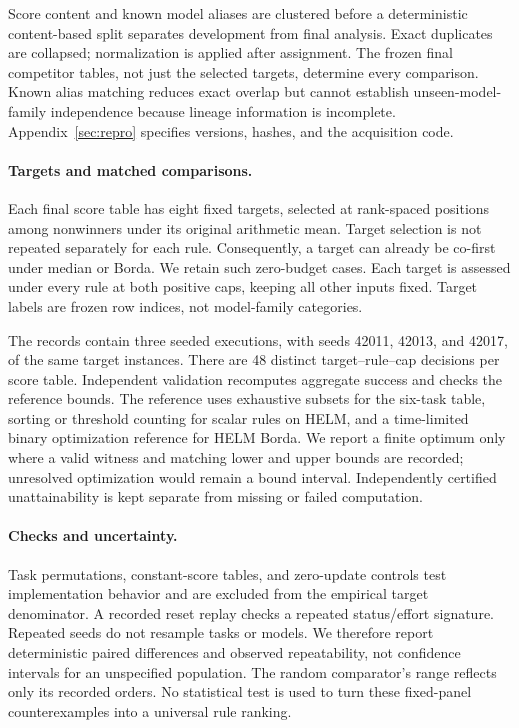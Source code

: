 \documentclass{article}
\begin{document}
Score content and known model aliases are clustered before a deterministic content-based split separates development from final analysis. Exact duplicates are collapsed; normalization is applied after assignment. The frozen final competitor tables, not just the selected targets, determine every comparison. Known alias matching reduces exact overlap but cannot establish unseen-model-family independence because lineage information is incomplete. Appendix~\ref{sec:repro} specifies versions, hashes, and the acquisition code.

\paragraph{Targets and matched comparisons.}
Each final score table has eight fixed targets, selected at rank-spaced positions among nonwinners under its original arithmetic mean. Target selection is not repeated separately for each rule. Consequently, a target can already be co-first under median or Borda. We retain such zero-budget cases. Each target is assessed under every rule at both positive caps, keeping all other inputs fixed. Target labels are frozen row indices, not model-family categories.

The records contain three seeded executions, with seeds 42011, 42013, and 42017, of the same target instances. There are 48 distinct target--rule--cap decisions per score table. Independent validation recomputes aggregate success and checks the reference bounds. The reference uses exhaustive subsets for the six-task table, sorting or threshold counting for scalar rules on HELM, and a time-limited binary optimization reference for HELM Borda. We report a finite optimum only where a valid witness and matching lower and upper bounds are recorded; unresolved optimization would remain a bound interval. Independently certified unattainability is kept separate from missing or failed computation.

\paragraph{Checks and uncertainty.}
Task permutations, constant-score tables, and zero-update controls test implementation behavior and are excluded from the empirical target denominator. A recorded reset replay checks a repeated status/effort signature. Repeated seeds do not resample tasks or models. We therefore report deterministic paired differences and observed repeatability, not confidence intervals for an unspecified population. The random comparator's range reflects only its recorded orders. No statistical test is used to turn these fixed-panel counterexamples into a universal rule ranking.
\end{document}
